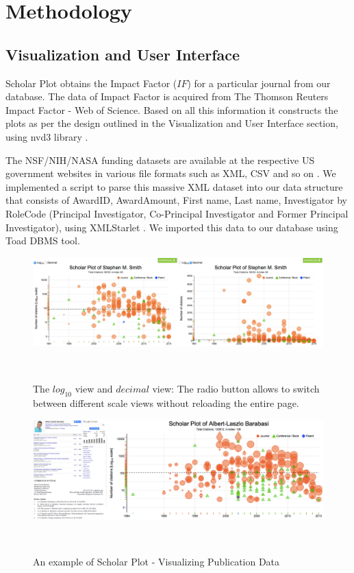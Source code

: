 \chapter{Methodology}\label{chap:Methods }


\section{Visualization and User Interface}
Scholar Plot obtains the Impact Factor ($IF$) for a particular journal from our database. The data of Impact Factor is acquired from The Thomson Reuters Impact Factor - Web of Science. Based on all this information it constructs the plots as per the design outlined in the Visualization and User Interface section, using nvd3 library \cite{nvd3org}.


The NSF/NIH/NASA funding datasets are available at the respective US government websites in various file formats such as XML, CSV and so on \cite{nsf, nih}. We implemented a script to parse this massive XML dataset into our data structure that consists of AwardID, AwardAmount, First name, Last name, Investigator by RoleCode (Principal Investigator, Co-Principal Investigator and Former Principal Investigator), using XMLStarlet \cite{XMLStarlet}. We imported this data to our database using Toad DBMS tool. %

\begin{figure}%
\centering
  \includegraphics[width=1\columnwidth]{figures/fig_scaleView}
  \caption{The $log_{10}$ view and $decimal$ view: The radio button allows to switch between different scale views without reloading the entire page.}~\label{fig:fig-scale}
\end{figure}

\begin{figure}
  \centering
  \includegraphics[width=1\columnwidth]{figures/fig_cv_google_scholarplot}
  \caption{An example of Scholar Plot - Visualizing Publication Data}~\label{fig:fig-publication}
\end{figure}

